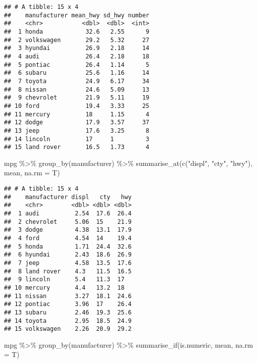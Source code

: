 \documentclass[
]{article}
\newenvironment{Shaded}{\begin{snugshade}}{\end{snugshade}}
\newcommand{\AttributeTok}[1]{\textcolor[rgb]{0.77,0.63,0.00}{#1}}
\newcommand{\FunctionTok}[1]{\textcolor[rgb]{0.00,0.00,0.00}{#1}}
\newcommand{\NormalTok}[1]{#1}
\newcommand{\SpecialCharTok}[1]{\textcolor[rgb]{0.00,0.00,0.00}{#1}}
\newcommand{\StringTok}[1]{\textcolor[rgb]{0.31,0.60,0.02}{#1}}
\begin{document}
\begin{verbatim}
## # A tibble: 15 x 4
##    manufacturer mean_hwy sd_hwy number
##    <chr>           <dbl>  <dbl>  <int>
##  1 honda            32.6   2.55      9
##  2 volkswagen       29.2   5.32     27
##  3 hyundai          26.9   2.18     14
##  4 audi             26.4   2.18     18
##  5 pontiac          26.4   1.14      5
##  6 subaru           25.6   1.16     14
##  7 toyota           24.9   6.17     34
##  8 nissan           24.6   5.09     13
##  9 chevrolet        21.9   5.11     19
## 10 ford             19.4   3.33     25
## 11 mercury          18     1.15      4
## 12 dodge            17.9   3.57     37
## 13 jeep             17.6   3.25      8
## 14 lincoln          17     1         3
## 15 land rover       16.5   1.73      4
\end{verbatim}

\begin{Shaded}
\begin{Highlighting}[]
\NormalTok{mpg }\SpecialCharTok{\%\textgreater{}\%}
  \FunctionTok{group\_by}\NormalTok{(manufacturer) }\SpecialCharTok{\%\textgreater{}\%}
  \FunctionTok{summarise\_at}\NormalTok{(}\FunctionTok{c}\NormalTok{(}\StringTok{"displ"}\NormalTok{, }\StringTok{"cty"}\NormalTok{, }\StringTok{"hwy"}\NormalTok{), mean, }\AttributeTok{na.rm =}\NormalTok{ T)}
\end{Highlighting}
\end{Shaded}

\begin{verbatim}
## # A tibble: 15 x 4
##    manufacturer displ   cty   hwy
##    <chr>        <dbl> <dbl> <dbl>
##  1 audi          2.54  17.6  26.4
##  2 chevrolet     5.06  15    21.9
##  3 dodge         4.38  13.1  17.9
##  4 ford          4.54  14    19.4
##  5 honda         1.71  24.4  32.6
##  6 hyundai       2.43  18.6  26.9
##  7 jeep          4.58  13.5  17.6
##  8 land rover    4.3   11.5  16.5
##  9 lincoln       5.4   11.3  17  
## 10 mercury       4.4   13.2  18  
## 11 nissan        3.27  18.1  24.6
## 12 pontiac       3.96  17    26.4
## 13 subaru        2.46  19.3  25.6
## 14 toyota        2.95  18.5  24.9
## 15 volkswagen    2.26  20.9  29.2
\end{verbatim}

\begin{Shaded}
\begin{Highlighting}[]
\NormalTok{mpg }\SpecialCharTok{\%\textgreater{}\%}
  \FunctionTok{group\_by}\NormalTok{(manufacturer) }\SpecialCharTok{\%\textgreater{}\%}
  \FunctionTok{summarise\_if}\NormalTok{(is.numeric, mean, }\AttributeTok{na.rm =}\NormalTok{ T)}
\end{Highlighting}
\end{Shaded}
\end{document}
